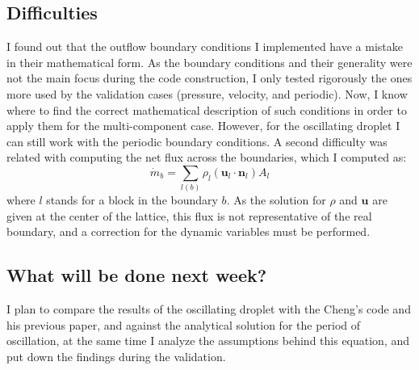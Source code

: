 \documentclass[12pt]{article}
\begin{document}
	\subsection*{Difficulties}
	I found out that the outflow boundary conditions I implemented have a mistake in their mathematical form. As the boundary conditions and their generality were not the main focus during the code construction, I only tested rigorously the ones more used by the validation cases (pressure, velocity, and periodic). Now, I know where to find the correct mathematical description of such conditions in order to apply them for the multi-component case. However, for the oscillating droplet I can still work with the periodic boundary conditions. A second difficulty was related with computing the net flux across the boundaries, which I computed as:
	\begin{equation*}
		\dot{m}_b = \sum_{l(b)} \rho_l (\mathbf{u}_l \cdot \mathbf{n}_l) A_l 
	\end{equation*}
	where $l$ stands for a block in the boundary $b$. As the solution for $\rho$ and $\mathbf{u}$ are given at the center of the lattice, this flux is not representative of the real boundary, and a correction for the dynamic variables must be performed. 
	
	\subsection*{What will be done next week?}
	I plan to compare the results of the oscillating droplet with the Cheng's code and his previous paper, and against the analytical solution for the period of oscillation, at the same time I analyze the assumptions behind this equation, and put down the findings during the validation.
	
	

	\printbibliography %
\end{document}
